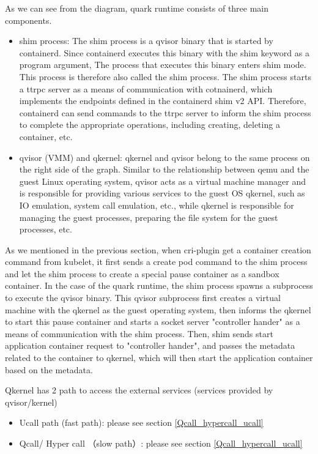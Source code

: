 As we can see from the diagram, quark runtime consists of three main components.
\begin{itemize}
    \item  shim process: The shim process is a qvisor binary that is started by containerd. Since containerd executes this binary with the shim keyword as a program argument, The process that executes this binary enters shim mode. This process  is therefore also called the shim process. The shim process starts a ttrpc server as a means of communication with cotnainerd, which implements the endpoints defined in the containerd shim v2 API. Therefore, containerd can send commands to the ttrpc server to inform the shim process to complete the appropriate operations, including creating, deleting a container, etc.
    \item  qvisor (VMM) and qkernel: qkernel and qvisor belong to the same process on the right side of the graph. Similar to the relationship between qemu and the guest Linux operating system, qvisor acts as a virtual machine manager and is responsible for providing various services to the guest OS qkernel, such as IO emulation, system call emulation, etc., while qkernel is responsible for managing the guest processes, preparing the file system for the guest processes, etc.
\end{itemize}
As we mentioned in the previous section, when cri-plugin get a container creation command from kubelet, it first sends a create pod command to the shim process and let the shim process to create a special 
pause container as a sandbox container. In the case of the quark runtime, the shim process spawns a subprocess to execute the qvisor binary. This qvisor subprocess first creates a virtual 
machine with the qkernel as the guest operating system, then informs the qkernel to start this pause container and starts a socket server "controller hander" as a means of communication with 
the shim process. Then, shim sends start application container request to "controller hander", and passes the metadata related to the container to qkernel, 
which will then start the application container based on the metadata.

Qkernel has 2 path to access the external services (services provided by qvisor/kernel)
\begin{itemize}
    \item  Ucall path (fast path): please see section \ref*{Qcall_hypercall_ucall}
    \item  Qcall/ Hyper call （slow path）: please see section \ref*{Qcall_hypercall_ucall}
\end{itemize}

